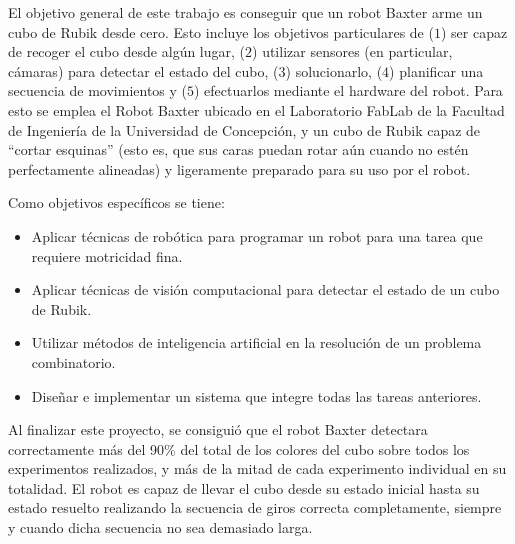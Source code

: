 El objetivo general de este trabajo es conseguir que un robot Baxter arme un cubo de Rubik desde cero. Esto incluye los objetivos particulares de ($1$) ser capaz de recoger el cubo desde algún lugar, ($2$) utilizar sensores (en particular, cámaras) para detectar el estado del cubo, ($3$) solucionarlo, ($4$) planificar una secuencia de movimientos y ($5$) efectuarlos mediante el hardware del robot. Para esto se emplea el Robot Baxter ubicado en el Laboratorio FabLab de la Facultad de Ingeniería de la Universidad de Concepción, y un cubo de Rubik capaz de ``cortar esquinas'' (esto es, que sus caras puedan rotar aún cuando no estén perfectamente alineadas) y ligeramente preparado para su uso por el robot.

Como objetivos específicos se tiene:
\begin{itemize}
	\item Aplicar técnicas de robótica para programar un robot para una tarea que requiere motricidad fina.
	\item Aplicar técnicas de visión computacional para detectar el estado de un cubo de Rubik.
	\item Utilizar métodos de inteligencia artificial en la resolución de un problema combinatorio.
	\item Diseñar e implementar un sistema que integre todas las tareas anteriores.
\end{itemize}

Al finalizar este proyecto, se consiguió que el robot Baxter detectara correctamente más del 90\% del total de los colores del cubo sobre todos los experimentos realizados, y más de la mitad de cada experimento individual en su totalidad. El robot es capaz de llevar el cubo desde su estado inicial hasta su estado resuelto realizando la secuencia de giros correcta completamente, siempre y cuando dicha secuencia no sea demasiado larga.
